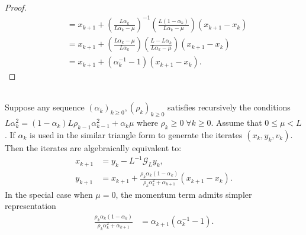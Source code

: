 \documentclass[12pt]{article}
\begin{document}
\begin{proof}
\begin{align*}
                &= 
                x_{k + 1} + \left(
                    \frac{L\alpha_k}{L\alpha_k - \mu}
                \right)^{-1}\left(
                    \frac{L(1 - \alpha_k)}{L\alpha_k - \mu}
                \right)(x_{k + 1} - x_k)
                \\
                &= 
                x_{k + 1} + \left(
                    \frac{L\alpha_k - \mu}{L\alpha_k}
                \right)\left(
                    \frac{L - L\alpha_k}{L\alpha_k - \mu}
                \right)(x_{k + 1} - x_k)
                \\
                &= x_{k + 1} + (\alpha_k^{-1} - 1)(x_{k + 1} - x_k). 
            \end{align*}
        \end{proof}
    
    \begin{proposition}\label{prop:wapg-momentum-form}
        \;\\
        Suppose any sequence $(\alpha_k)_{k \ge 0}, (\rho_k)_{k \ge0}$ satisfies recursively the conditions
        $L\alpha_k^2 = (1 - \alpha_k)L\rho_{k - 1}\alpha_{k - 1}^2 + \alpha_k \mu$ where $\rho_{k} \ge 0\; \forall k \ge0$. 
        Assume that $0 \le \mu < L$. 
        If $\alpha_k$ is used in the similar triangle form to generate the iterates $(x_k, y_k, v_k)$. 
        Then the iterates are algebraically equivalent to: 
        \begin{align*}
            x_{k + 1} &= y_k - L^{-1}\mathcal G_Ly_k, 
            \\
            y_{k + 1} &= 
            x_{k + 1} + 
            \frac{\rho_k\alpha_k(1 - \alpha_k)}{\rho_k\alpha_k^2 + \alpha_{k + 1}}(x_{k + 1} - x_k). 
        \end{align*}
        In the special case when $\mu = 0$, the momentum term admits simpler representation 
        \begin{align*}
        \frac{\rho_k\alpha_k(1 - \alpha_k)}{\rho_k\alpha_k^2 + \alpha_{k + 1}}
        & = \alpha_{k + 1}(\alpha_k^{-1} - 1). 
        \end{align*}
    \end{proposition}
\end{document}
